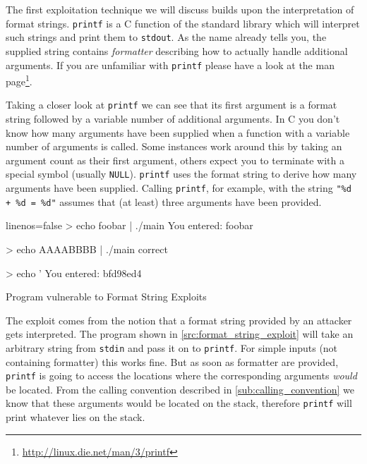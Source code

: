 \documentclass[article]{uibk}
\begin{document}
The first exploitation technique we will discuss builds upon the interpretation
of format strings. \texttt{printf} is a C function of the standard library
which will interpret such strings and print them to \texttt{stdout}. As the
name already tells you, the supplied string contains \textit{formatter}
describing how to actually handle additional arguments. If you are unfamiliar
with \texttt{printf} please have a look at the man
page\footnote{\url{http://linux.die.net/man/3/printf}}.

Taking a closer look at \texttt{printf} we can see that its first argument is a
format string followed by a variable number of additional arguments. In C you
don't know how many arguments have been supplied when a function with a
variable number of arguments is called. Some instances work around this by
taking an argument count as their first argument, others expect you to
terminate with a special symbol (usually \texttt{NULL}). \texttt{printf} uses
the format string to derive how many arguments have been supplied. Calling
\texttt{printf}, for example, with the string \texttt{"\%d + \%d = \%d"}
assumes that (at least) three arguments have been provided.

\begin{listing}[h!]
    \begin{minipage}[t]{0.4\textwidth}
    \end{minipage}\hfill
    \begin{minipage}[t]{0.5\textwidth}
        \begin{code*}{linenos=false}
            > echo foobar | ./main
            You entered:
            foobar


            > echo AAAABBBB | ./main
            correct


            > echo '%
            You entered:
            bfd98ed4
        \end{code*}
    \end{minipage}
    \caption{Program vulnerable to Format String Exploits}
    \label{src:format_string_exploit}
\end{listing}

The exploit comes from the notion that a format string provided by an attacker
gets interpreted. The program shown in \cref{src:format_string_exploit} will
take an arbitrary string from \texttt{stdin} and pass it on to \texttt{printf}.
For simple inputs (not containing formatter) this works fine. But as soon as
formatter are provided, \texttt{printf} is going to access the locations where
the corresponding arguments \emph{would} be located. From the calling
convention described in \cref{sub:calling_convention} we know that these
arguments would be located on the stack, therefore \texttt{printf} will print
whatever lies on the stack.
\end{document}
